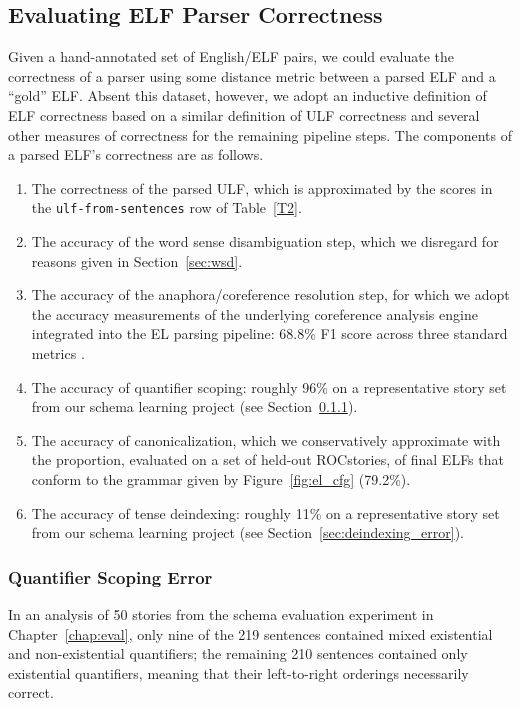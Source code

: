 \subsection{Evaluating ELF Parser Correctness}
Given a hand-annotated set of English/ELF pairs, we could evaluate the correctness of a parser using some distance metric between a parsed ELF and a ``gold'' ELF. Absent this dataset, however, we adopt an inductive definition of ELF correctness based on a similar definition of ULF correctness and several other measures of correctness for the remaining pipeline steps. The components of a parsed ELF's correctness are as follows.

\begin{enumerate}
    \item The correctness of the parsed ULF, which is approximated by the scores in the \texttt{ulf-from-sentences} row of Table~\ref{T2}.
    \item The accuracy of the word sense disambiguation step, which we disregard for reasons given in Section~\ref{sec:wsd}.
    \item The accuracy of the anaphora/coreference resolution step, for which we adopt the accuracy measurements of the underlying coreference analysis engine integrated into the EL parsing pipeline: 68.8\% F1 score across three standard metrics \citep{allennlp-coref}.
    \item The accuracy of quantifier scoping: roughly 96\% on a representative story set from our schema learning project (see Section~\ref{sec:scoping_error}).
    \item The accuracy of canonicalization, which we conservatively approximate with the proportion, evaluated on a set of held-out ROCstories, of final ELFs that conform to the grammar given by Figure~\ref{fig:el_cfg} (79.2\%).
    \item The accuracy of tense deindexing: roughly 11\% on a representative story set from our schema learning project (see Section~\ref{sec:deindexing_error}).
\end{enumerate}

\subsubsection{Quantifier Scoping Error}
\label{sec:scoping_error}
In an analysis of 50 stories from the schema evaluation experiment in Chapter~\ref{chap:eval}, only nine of the 219 sentences contained mixed existential and non-existential quantifiers; the remaining 210 sentences contained only existential quantifiers, meaning that their left-to-right orderings necessarily correct.

